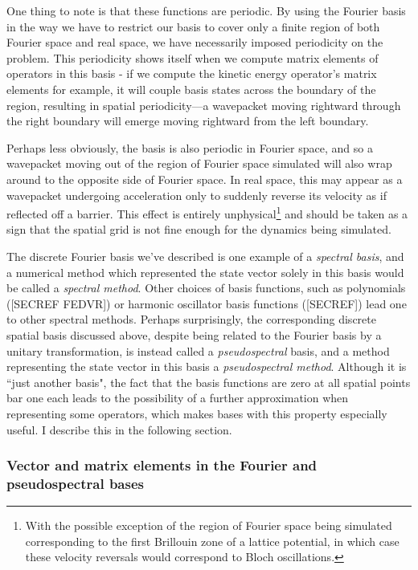 One thing to note is that these functions are periodic. By using the Fourier basis in the way we have to restrict our basis to cover only a finite region of both Fourier space and real space, we have necessarily imposed periodicity on the problem. This periodicity shows itself when we compute matrix elements of operators in this basis - if we compute the kinetic energy operator's matrix elements for example, it will couple basis states across the boundary of the region, resulting in spatial periodicity---a wavepacket moving rightward through the right boundary will emerge moving rightward from the left boundary.

Perhaps less obviously, the basis is also periodic in Fourier space, and so a wavepacket moving out of the region of Fourier space simulated will also wrap around to the opposite side of Fourier space. In real space, this may appear as a wavepacket undergoing acceleration only to suddenly reverse its velocity as if reflected off a barrier. This effect is entirely unphysical\footnote{With the possible exception of the region of Fourier space being simulated corresponding to the first Brillouin zone of a lattice potential, in which case these velocity reversals would correspond to Bloch oscillations.} and should be taken as a sign that the spatial grid is not fine enough for the dynamics being simulated.

The discrete Fourier basis we've described is one example of a \emph{spectral basis}, and a numerical method which represented the state vector solely in this basis would be called a \emph{spectral method}. Other choices of basis functions, such as polynomials ([SECREF FEDVR]) or harmonic oscillator basis functions ([SECREF]) lead one to other spectral methods. Perhaps surprisingly, the corresponding discrete spatial basis discussed above, despite being related to the Fourier basis by a unitary transformation, is instead called a \emph{pseudospectral} basis, and a method representing the state vector in this basis a \emph{pseudospectral method}. Although it is ``just another basis", the fact that the basis functions are zero at all spatial points bar one each leads to the possibility of a further approximation when representing some operators, which makes bases with this property especially useful. I describe this in the following section.

\subsubsection{Vector and matrix elements in the Fourier and pseudospectral bases}

